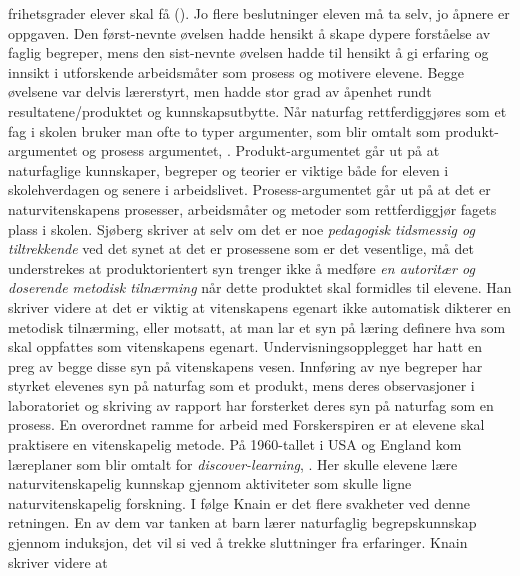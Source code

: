 \documentclass[main.tex]{subfiles}
\begin{document}
frihetsgrader elever skal få (). Jo flere beslutninger eleven må ta selv, jo åpnere 
er oppgaven. Den først-nevnte øvelsen hadde hensikt å skape dypere forståelse av faglig begreper, 
mens den sist-nevnte øvelsen hadde til hensikt å gi erfaring og innsikt i utforskende arbeidsmåter 
som prosess og motivere elevene. Begge øvelsene var delvis lærerstyrt, men hadde stor grad av 
åpenhet rundt resultatene/produktet og kunnskapsutbytte.
\newline
\newline
Når naturfag rettferdiggjøres som et fag i skolen bruker man ofte to typer argumenter, som blir
omtalt som produkt-argumentet og prosess argumentet, . Produkt-argumentet går 
ut på at naturfaglige kunnskaper, begreper og teorier er viktige både for eleven i skolehverdagen og 
senere i arbeidslivet. Prosess-argumentet går ut på at det er naturvitenskapens prosesser, 
arbeidsmåter og metoder som rettferdiggjør fagets plass i skolen. \iffalse \citeauthor{sjob04} \else 
Sjøberg \fi skriver at selv om det er noe \emph{pedagogisk tidsmessig og tiltrekkende} ved det synet 
at det er prosessene som er det vesentlige, må det understrekes at produktorientert syn trenger ikke 
å medføre \emph{en autoritær og doserende metodisk tilnærming} når dette produktet skal formidles 
til elevene. \iffalse \citeauthor{sjob04} \else Han \fi skriver videre at det er viktig at 
vitenskapens egenart ikke automatisk dikterer en metodisk tilnærming, eller motsatt, at man lar et 
syn på læring definere hva som skal oppfattes som vitenskapens egenart. Undervisningsopplegget har 
hatt en preg av begge disse syn på vitenskapens vesen. Innføring av nye begreper har styrket 
elevenes syn på naturfag som et produkt, mens deres observasjoner i laboratoriet og skriving av 
rapport har forsterket deres syn på naturfag som en prosess. 
\newline
\newline
En overordnet ramme for arbeid med Forskerspiren er at elevene skal praktisere en vitenskapelig 
metode. På 1960-tallet i USA og England kom læreplaner som blir omtalt
for \emph{discover-learning}, . Her skulle elevene lære naturvitenskapelig 
kunnskap gjennom aktiviteter som skulle ligne naturvitenskapelig forskning. I følge \iffalse 
\citeauthor{knai11} \else Knain \fi  er det flere svakheter ved denne retningen. En av dem var 
tanken at barn lærer naturfaglig begrepskunnskap gjennom induksjon, det vil si ved å trekke 
sluttninger fra erfaringer. \iffalse \citeauthor{knai11} \else Knain \fi skriver videre at
\end{document}
